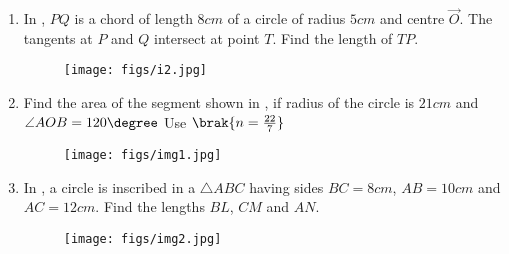 \begin{enumerate}
\item In , $PQ$ is a chord of length $8 cm$ of a circle of radius $5 cm$ and centre $\vec{O}$. The tangents at $P$ and $Q$ intersect at point $T$. Find the length of $TP$.
\begin{figure}[H]                                             \centering
         \texttt{[image: figs/i2.jpg]}
			\caption{}
			\label{fig:figure2}

                \end{figure}
\item Find the area of the segment shown in , if radius of the circle is $21 cm$ and $\angle AOB = 120\degree$ Use $\brak{n =\frac{22}{7}} $
\begin{figure}[H]                                     
\centering
	
 \texttt{[image: figs/img1.jpg]}
		
\caption{}
		
\label{fig:figure5}
\end{figure}
\item In , a circle is inscribed in a $\triangle ABC$ having sides $BC=8 cm$, $AB = 10cm$ and $AC = 12 cm$. Find the lengths $BL$, $CM$ and $AN$.
                                         
\begin{figure}[H]                                     
\centering
\texttt{[image: figs/img2.jpg]}
\caption{}
\label{fig:figure6}

 \end{figure}
\end{enumerate}